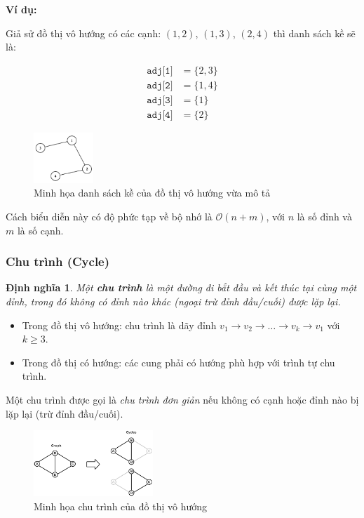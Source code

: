 \documentclass{article}
\newtheorem{dinhnghia}{Định nghĩa}
\begin{document}
\textbf{Ví dụ:}

Giả sử đồ thị vô hướng có các cạnh: $(1,2)$, $(1,3)$, $(2,4)$ thì danh sách kề sẽ là:

\begin{align*}
\texttt{adj[1]} &= \{2, 3\} \\
\texttt{adj[2]} &= \{1, 4\} \\
\texttt{adj[3]} &= \{1\} \\
\texttt{adj[4]} &= \{2\}
\end{align*}

\begin{figure}[H]
    \centering
    \includegraphics[width=0.2\textwidth]{img/b1/adjlist.png}
    \caption{Minh họa danh sách kề của đồ thị vô hướng vừa mô tả}
    \label{fig:adjlist}
\end{figure}

Cách biểu diễn này có độ phức tạp về bộ nhớ là $\mathcal{O}(n + m)$, với $n$ là số đỉnh và $m$ là số cạnh.

\subsubsection{Chu trình (Cycle)}
\begin{dinhnghia}
    Một \textbf{chu trình} là một đường đi bắt đầu và kết thúc tại cùng một đỉnh, trong đó không có đỉnh nào khác (ngoại trừ đỉnh đầu/cuối) được lặp lại.
\end{dinhnghia}
    \begin{itemize}
        \item Trong đồ thị vô hướng: chu trình là dãy đỉnh $v_1 \rightarrow v_2 \rightarrow \dots \rightarrow v_k \rightarrow v_1$ với $k \geq 3$.
        \item Trong đồ thị có hướng: các cung phải có hướng phù hợp với trình tự chu trình.
    \end{itemize}
    
    Một chu trình được gọi là \textit{chu trình đơn giản} nếu không có cạnh hoặc đỉnh nào bị lặp lại (trừ đỉnh đầu/cuối).
    
\begin{figure}[H]
    \centering
    \includegraphics[width=0.4\textwidth]{img/b1/cycle.png}
    \caption{Minh họa chu trình của đồ thị vô hướng}
    \label{fig:cycle}
\end{figure}
\end{document}

